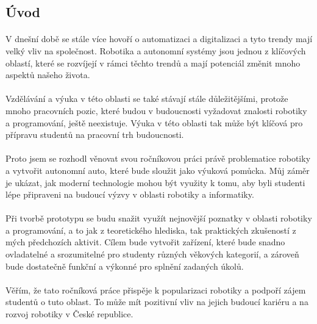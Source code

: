 \documentclass[12pt]{article}
\begin{document}
\begin{spacing}{1.5}
	\newpage
	\tableofcontents
	
	\newpage
	\section{Úvod}
	\paragraph{} V dnešní době se stále více hovoří o automatizaci a digitalizaci a tyto trendy mají velký vliv na společnost. Robotika a autonomní systémy jsou jednou z klíčových oblastí, které se rozvíjejí v rámci těchto trendů a mají potenciál změnit mnoho aspektů našeho života.
	\paragraph{} Vzdělávání a výuka v této oblasti se také stávají stále důležitějšími, protože mnoho pracovních pozic, které budou v budoucnosti vyžadovat znalosti robotiky a programování, ještě neexistuje. Výuka v této oblasti tak může být klíčová pro přípravu studentů na pracovní trh budoucnosti.
	\paragraph{} Proto jsem se rozhodl věnovat svou ročníkovou práci právě problematice robotiky a vytvořit autonomní auto, které bude sloužit jako výuková pomůcka. Můj záměr je ukázat, jak moderní technologie mohou být využity k tomu, aby byli studenti lépe připraveni na budoucí výzvy v oblasti robotiky a informatiky.
	\paragraph{} Při tvorbě prototypu se budu snažit využít nejnovější poznatky v oblasti robotiky a programování, a to jak z teoretického hlediska, tak praktických zkušeností z mých předchozích aktivit. Cílem bude vytvořit zařízení, které bude snadno ovladatelné a srozumitelné pro studenty různých věkových kategorií, a zároveň bude dostatečně funkční a výkonné pro splnění zadaných úkolů.
	\paragraph{} Věřím, že tato ročníková práce přispěje k popularizaci robotiky a podpoří zájem studentů o tuto oblast. To může mít pozitivní vliv na jejich budoucí kariéru a na rozvoj robotiky v České republice.
	

\end{spacing}
\end{document}
